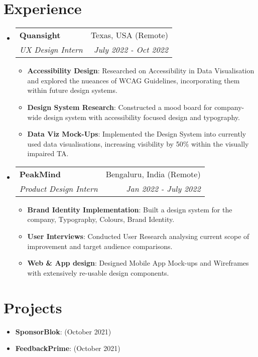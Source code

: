 \documentclass[a4paper,20pt]{article}
\makeatletter
\newcommand{\resumeItem}[2]{
  \item\small{
    \textbf{#1}{: #2 \vspace{-2pt}}
  }
}
\newcommand{\resumeSubheading}[4]{
  \vspace{-1pt}\item
    \begin{tabular*}{0.97\textwidth}{l@{\extracolsep{\fill}}r}
      \textbf{#1} & #2 \\
      \textit{#3} & \textit{#4} \\
    \end{tabular*}\vspace{-5pt}
}
\newcommand{\resumeSubItem}[2]{\resumeItem{#1}{#2}\vspace{-3pt}}
\newcommand{\resumeSubHeadingListStart}{\begin{itemize}[leftmargin=*]}
\newcommand{\resumeSubHeadingListEnd}{\end{itemize}}
\newcommand{\resumeItemListStart}{\begin{itemize}}
\newcommand{\resumeItemListEnd}{\end{itemize}\vspace{-5pt}}
\makeatother
\begin{document}
\vspace{-5pt}
\section{Experience}
  \resumeSubHeadingListStart
    \resumeSubheading{Quansight}{Texas, USA (Remote)}
    {UX Design Intern}{July 2022 - Oct 2022}
    \resumeItemListStart
        \resumeItem{Accessibility Design}
          {Researched on Accessibility in Data Visualisation and explored the nueances of WCAG Guidelines, incorporating them within future design systems. }
          \resumeItem{Design System Research}
          {Constructed a mood board for company-wide design system with accessibility focused design and typography.}
          \resumeItem{Data Viz Mock-Ups}{Implemented the Design System into currently used data visualisations, increasing visibility by 50\% within the visually impaired TA.}
      \resumeItemListEnd
\vspace{-5pt}
    \resumeSubheading
		{PeakMind}{Bengaluru, India (Remote)}
		{Product Design Intern}{Jan 2022 -  July 2022}
		\resumeItemListStart
        \resumeItem{Brand Identity Implementation}
          {Built a design system for the company, Typography, Colours, Brand Identity.}
        \resumeItem{User Interviews}
          {Conducted User Research analysing current scope of improvement and target audience comparisons.}
        \resumeItem{Web \& App design}{Designed Mobile App Mock-ups and Wireframes with extensively re-usable design components.}
		\resumeItemListEnd

\resumeSubHeadingListEnd

\vspace{-5pt}
\section{Projects}
\resumeSubHeadingListStart
\resumeSubItem{SponsorBlok}{(October 2021)}{StoryBloks, NextJS, AnimeJS, Figma}
\vspace{2pt}
\resumeSubItem{FeedbackPrime}{(October 2021)}{Symbl.ai, Kotlin, Sawo Labs, Figma}
\resumeSubHeadingListEnd
\vspace{-5pt}
\end{document}
